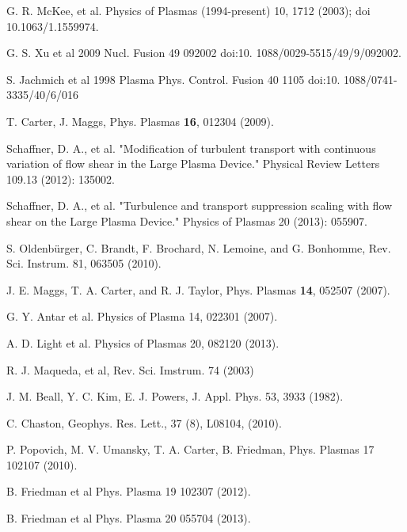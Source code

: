 \documentclass[%
 reprint,
 amsmath,amssymb,
 aps,
]{revtex4-1}
\begin{document}
\providecommand{\noopsort}[1]{}\providecommand{\singleletter}[1]{#1}%
\begin{thebibliography}{10}


G. R. McKee, et al. Physics of Plasmas (1994-present) 10, 1712 (2003); doi 10.1063/1.1559974.

G. S. Xu et al 2009 Nucl. Fusion 49 092002 doi:10. 1088/0029-5515/49/9/092002.

S. Jachmich et al 1998 Plasma Phys. Control. Fusion 40 1105 doi:10. 1088/0741-3335/40/6/016


T. Carter, J. Maggs, Phys. Plasmas {\bf 16}, 012304 (2009).

Schaffner, D. A., et al. "Modification of turbulent transport with continuous variation of flow shear in the Large Plasma Device." Physical Review Letters 109.13 (2012): 135002.

Schaffner, D. A., et al. "Turbulence and transport suppression scaling with flow shear on the Large Plasma Device." Physics of Plasmas 20 (2013): 055907.

S. Oldenbürger, C. Brandt, F. Brochard, N. Lemoine, and G. Bonhomme, Rev. Sci. Instrum. 81, 063505 (2010).

J. E. Maggs, T. A. Carter, and R. J. Taylor, Phys. Plasmas {\bf 14}, 052507 (2007).


G. Y. Antar et al. Physics of Plasma 14, 022301 (2007).

A. D. Light et al. Physics of Plasmas 20, 082120 (2013).


R. J. Maqueda, et al, Rev. Sci. Imstrum. 74 (2003)


J. M. Beall, Y. C. Kim, E. J. Powers, J. Appl. Phys. 53, 3933 (1982).

C. Chaston, Geophys. Res. Lett., 37 (8), L08104, (2010).

P. Popovich, M. V. Umansky, T. A. Carter, B. Friedman, Phys. Plasmas 17 102107 (2010).

B. Friedman et al Phys. Plasma 19 102307 (2012).

B. Friedman et al Phys. Plasma 20 055704 (2013).


\end{thebibliography}
\end{document}
